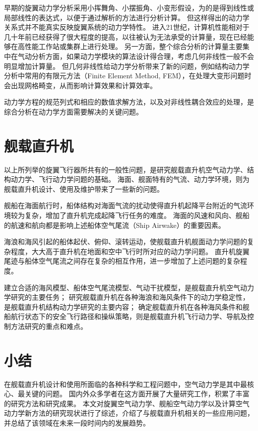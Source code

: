 早期的旋翼动力学分析采用小挥舞角、小摆振角、小变形假设，为的是得到线性或局部线性的表达式，以便于通过解析的方法进行分析计算。
但这样得出的动力学关系式并不能真实反映旋翼系统的动力学特性。
进入21世纪，计算机性能相对于几十年前已经获得了很大程度的提高，以往被认为无法承受的计算量，现在已经能够在高性能工作站或集群上进行处理。
另一方面，整个综合分析的计算量主要集中在气动分析方面，如果动力学模块的算法设计得合理，考虑几何非线性一般不会明显增加计算量。
但几何非线性给动力学分析带来了新的问题，例如结构动力学分析中常用的有限元方法（Finite Element Method, FEM），在处理大变形问题时会出现网格畸变，从而影响计算效果和计算效率。

动力学方程的规范列式和相应的数值求解方法，以及对非线性耦合效应的处理，是综合分析在动力学方面需要解决的关键问题。

\section{舰载直升机}
以上所列举的旋翼飞行器所共有的一般性问题，是研究舰载直升机空气动力学、结构动力学、飞行动力学问题的基础。
海面、舰面特有的气流、动力学环境，则为舰载直升机设计、使用及维护带来了一些新的问题。

舰船在海面航行时，船体结构对海面气流的扰动使得直升机起降平台附近的气流环境较为复杂，增加了直升机完成起降飞行任务的难度。
海面的风速和风向、舰船的航速和航向都是影响上述船体空气尾流（Ship Airwake）的重要因素。

海浪和海风引起的船体起伏、俯仰、滚转运动，使舰载直升机舰面动力学问题的复杂程度，大大高于直升机在地面和空中飞行时所对应的动力学问题。
直升机旋翼尾迹与船体空气尾流之间存在复杂的相互作用，进一步增加了上述问题的复杂程度。

建立合适的海风模型、船体空气尾流模型、气动干扰模型，是舰载直升机空气动力学研究的主要任务；
研究舰载直升机在各种海浪和海风条件下的动力学稳定性，是舰载直升机结构动力学研究的主要内容；
确定舰载直升机在各种海风条件和舰船航行状态下的安全飞行路径和操纵策略，则是舰载直升机飞行动力学、导航及控制方法研究的重点和难点。

\section{小结}

在舰载直升机设计和使用所面临的各种科学和工程问题中，空气动力学是其中最核心、最关键的问题。
国内外众多学者在这方面开展了大量研究工作，积累了丰富的研究方法和研究成果。
本文对旋翼空气动力学、舰船空气动力学以及计算空气动力学新方法的研究现状进行了综述，介绍了与舰载直升机相关的一些应用问题，并总结了该领域在未来一段时间内的发展趋势。
